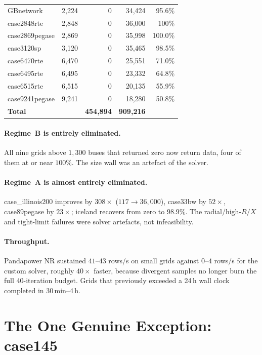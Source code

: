 \documentclass{article}
\newcommand{\cok}[1]{\textcolor{good}{#1}}
\newcommand{\cwarn}[1]{\textcolor{warn}{#1}}
\newcommand{\cbad}[1]{\textcolor{bad}{#1}}
\begin{document}
\begin{longtable}{l r r r r}
GBnetwork         & 2{,}224 & \cbad{0}   & \cok{34{,}424} & 95.6\% \\
case2848rte       & 2{,}848 & \cbad{0}   & \cok{36{,}000} & 100\% \\
case2869pegase    & 2{,}869 & \cbad{0}   & \cok{35{,}998} & 100.0\% \\
case3120sp        & 3{,}120 & \cbad{0}   & \cok{35{,}465} & 98.5\% \\
case6470rte       & 6{,}470 & \cbad{0}   & \cwarn{25{,}551} & 71.0\% \\
case6495rte       & 6{,}495 & \cbad{0}   & \cwarn{23{,}332} & 64.8\% \\
case6515rte       & 6{,}515 & \cbad{0}   & \cwarn{20{,}135} & 55.9\% \\
case9241pegase    & 9{,}241 & \cbad{0}   & \cwarn{18{,}280} & 50.8\% \\
\midrule
\textbf{Total}    &         & \textbf{454{,}894} & \textbf{909{,}216} & \\
\bottomrule
\end{longtable}

\paragraph{Regime~B is entirely eliminated.}
All nine grids above $1{,}300$ buses that returned zero now return data, four
of them at or near $100\%$.  The size wall was an artefact of the solver.

\paragraph{Regime~A is almost entirely eliminated.}
case\_illinois200 improves by $308\times$ ($117 \to 36{,}000$), case33bw by
$52\times$, case89pegase by $23\times$; iceland recovers from zero to
$98.9\%$.  The radial/high-$R/X$ and tight-limit failures were solver
artefacts, not infeasibility.

\paragraph{Throughput.}
Pandapower NR sustained $41$--$43$ rows/s on small grids against $0$--$4$
rows/s for the custom solver, roughly $40\times$ faster, because divergent
samples no longer burn the full 40-iteration budget.  Grids that previously
exceeded a 24\,h wall clock completed in 30\,min--4\,h.


\section{The One Genuine Exception: case145}
\end{document}
